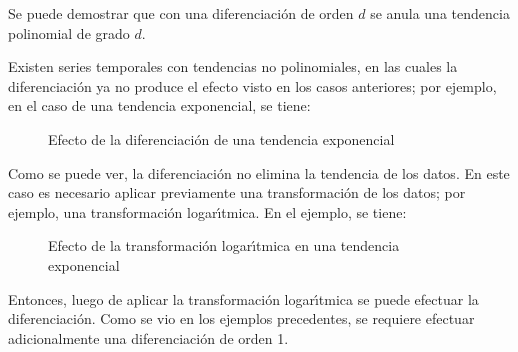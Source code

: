 \begin{observacion}
 Se puede demostrar que con una 
diferenciaci\'{o}n de orden $d$ se anula una tendencia 
polinomial de grado $d$.
\end{observacion}


\begin{observacion}
Existen series temporales con tendencias no polinomiales, en las cuales la diferenciaci\'{o}n ya no produce el efecto visto en los casos anteriores; por ejemplo, en el caso de una tendencia exponencial, se tiene:
\begin{figure}[H]
\centering
\caption{Efecto de la diferenciaci\'{o}n de una tendencia exponencial}
\end{figure}

Como se puede ver, la diferenciaci\'{o}n no elimina la tendencia de los 
datos. En este caso es necesario aplicar previamente una transformaci\'{o}n 
de los datos; por ejemplo, una transformaci\'{o}n logar\'{\i}tmica. En el 
ejemplo, se tiene:
\begin{figure}[H]
\centering
\caption{Efecto de la transformaci\'{o}n logar\'{\i}tmica en una 
tendencia exponencial}
\end{figure}

Entonces, luego de aplicar la transformaci\'{o}n logar\'{\i}tmica se puede 
efectuar la diferenciaci\'{o}n. Como se vio en los ejemplos precedentes, se 
requiere efectuar adicionalmente una diferenciaci\'{o}n de orden 1. 
\end{observacion}


